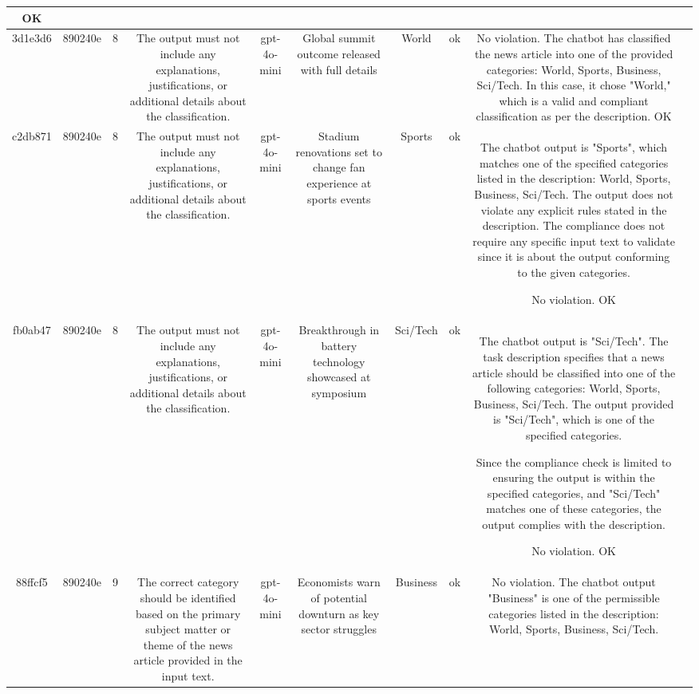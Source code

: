 \begin{table}[h!]
\begin{tabular}{|c|c|c|c|c|c|c|c|c|c|}
OK & \\
\hline
3d1e3d6 & 890240e & 8 & The output must not include any explanations, justifications, or additional details about the classification. & gpt-4o-mini & Global summit outcome released with full details & World & ok & No violation. The chatbot has classified the news article into one of the provided categories: World, Sports, Business, Sci/Tech. In this case, it chose "World," which is a valid and compliant classification as per the description.
OK & \\
\hline
c2db871 & 890240e & 8 & The output must not include any explanations, justifications, or additional details about the classification. & gpt-4o-mini & Stadium renovations set to change fan experience at sports events & Sports & ok & The chatbot output is "Sports", which matches one of the specified categories listed in the description: World, Sports, Business, Sci/Tech. The output does not violate any explicit rules stated in the description. The compliance does not require any specific input text to validate since it is about the output conforming to the given categories.

No violation.
OK & \\
\hline
fb0ab47 & 890240e & 8 & The output must not include any explanations, justifications, or additional details about the classification. & gpt-4o-mini & Breakthrough in battery technology showcased at symposium & Sci/Tech & ok & The chatbot output is "Sci/Tech". The task description specifies that a news article should be classified into one of the following categories: World, Sports, Business, Sci/Tech. The output provided is "Sci/Tech", which is one of the specified categories. 

Since the compliance check is limited to ensuring the output is within the specified categories, and "Sci/Tech" matches one of these categories, the output complies with the description.

No violation.
OK & \\
\hline
88ffcf5 & 890240e & 9 & The correct category should be identified based on the primary subject matter or theme of the news article provided in the input text. & gpt-4o-mini & Economists warn of potential downturn as key sector struggles & Business & ok & No violation. The chatbot output "Business" is one of the permissible categories listed in the description: World, Sports, Business, Sci/Tech.


\end{tabular}
\end{table}
